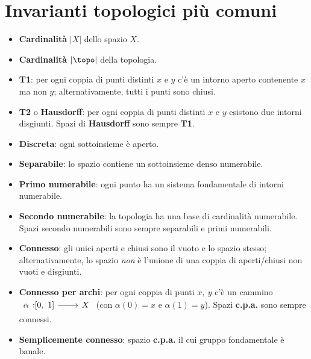 \section{Invarianti topologici più comuni}
\begin{multicols}{2}
	\textls{\textsc{\textcolor{reddo}{Cardinalità}}}
	\begin{itemize}
		\item \textbf{Cardinalità} $\vert X\vert$ dello spazio $X$.
		\item \textbf{Cardinalità} $\vert \topo\vert$ della topologia.
	\end{itemize}
\textls{\textsc{\textcolor{reddo}{Assiomi di separazione}}}
\begin{itemize}
	\item \textbf{T1}: per ogni coppia di punti distinti $x$ e $y$ c'è un intorno aperto contenente $x$ ma non $y$; alternativamente, tutti i punti sono chiusi.
	\item \textbf{T2} o \textbf{Hausdorff}: per ogni coppia di punti distinti $x$ e $y$ esistono due intorni disgiunti. Spazi di \textbf{Hausdorff} sono sempre \textbf{T1}.
	\item \textbf{Discreta}: ogni sottoinsieme è aperto.
\end{itemize}
\textls{\textsc{\textcolor{reddo}{Assiomi di numerabilità}}}
\begin{itemize}
	\item \textbf{Separabile}: lo spazio contiene un sottoinsieme denso numerabile.
	\item \textbf{Primo numerabile}: ogni punto ha un sistema fondamentale di intorni numerabile.
	\item \textbf{Secondo numerabile}: la topologia ha una base di cardinalità numerabile. Spazi secondo numerabili sono sempre separabili e primi numerabili.
\end{itemize}
\textls{\textsc{\textcolor{reddo}{Connessione}}}
\begin{itemize}
	\item \textbf{Connesso}: gli unici aperti e chiusi sono il vuoto e lo spazio stesso; alternativamente, lo spazio \textit{non} è l'unione di una coppia di aperti/chiusi non vuoti e disgiunti.
	\item \textbf{Connesso per archi}: per ogni coppia di punti $x,\ y$ c'è un cammino $\funz{\alpha}{\left[0,\ 1\right]}{X}$ (con $\alpha\left(0\right)=x$ e $\alpha\left(1\right)=y$). Spazi \textbf{c.p.a.} sono sempre connessi.
	\item \textbf{Semplicemente connesso}: spazio \textbf{c.p.a.} il cui gruppo fondamentale è banale.

\end{itemize}
\end{multicols}
